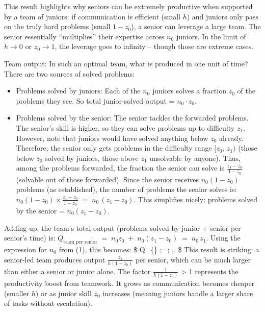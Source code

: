 \documentclass[12pt]{article}
\begin{document}
This result highlights why seniors can be extremely productive when
supported by a team of juniors: if communication is efficient (small
\(h\)) and juniors only pass on the truly hard problems (small
\(1-z_0\)), a senior can leverage a large team. {The senior
essentially ``multiplies'' their expertise across \(n_0\) juniors.} In
the limit of \(h \to 0\) or \(z_0 \to 1\), the leverage goes to infinity
-- though those are extreme cases.

{Team output:} In such an optimal team, what is produced in one
unit of time? There are two sources of solved problems:

\begin{itemize}
\tightlist
\item
  {Problems solved by juniors:} Each of the \(n_0\) juniors
  solves a fraction \(z_0\) of the problems they see. So total
  junior-solved output = \(n_0 \cdot z_0\).
\item
  {Problems solved by the senior:} The senior tackles the
  forwarded problems. The senior's skill is higher, so they can solve
  problems up to difficulty \(z_1\). However, note that juniors would
  have solved anything below \(z_0\) already. Therefore, the senior only
  {gets} problems in the difficulty range \([z_0,\, z_1)\) (those
  below \(z_0\) solved by juniors, those above
  $z_1$ unsolvable by anyone). Thus, among the problems forwarded, the fraction the senior can solve is \(\frac{z_1 - z_0}{\,1 - z_0\,}\)
  (solvable out of those forwarded). Since the senior receives
  \(n_0(1-z_0)\) problems (as established), the number of problems the
  senior solves is:
  \(n_0 (1-z_0) \times \frac{z_1 - z_0}{\,1 - z_0\,} \;=\; n_0\,(z_1 - z_0).\)
  This simplifies nicely: {problems solved by the senior =
  \(n_0 (z_1 - z_0)\).}
\end{itemize}

Adding up, the {team's total output} (problems solved by junior +
senior per senior's time) is:
\(Q_{\text{team per senior}} \;=\; n_0 z_0 \;+\; n_0 (z_1 - z_0) \;=\; n_0\, z_1.\)
Using the expression for \(n_0\) from (1), this becomes: \$
Q\_\{\} ;=; ,. \$
This result is striking: a senior-led team produces output
\(\frac{z_1}{h(1-z_0)}\) per senior, which can be much larger than
either a senior or junior alone. The factor \(\frac{1}{h(1-z_0)}\)
\textgreater{} 1 represents the {productivity boost from
teamwork}. It grows as communication becomes cheaper (smaller \(h\)) or
as junior skill \(z_0\) increases (meaning juniors handle a larger share
of tasks without escalation).
\end{document}
